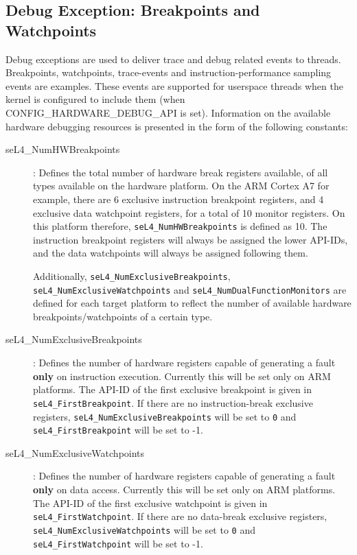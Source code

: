 \subsection{Debug Exception: Breakpoints and Watchpoints}
\label{sec:debug_exceptions}

Debug exceptions are used to deliver trace and debug related events to threads.
Breakpoints, watchpoints, trace-events and instruction-performance sampling
events are examples. These events are supported for userspace threads when the kernel
is configured to include them (when CONFIG\_HARDWARE\_DEBUG\_API is set). Information
on the available hardware debugging resources is presented in the form of the following constants:

\begin{description}
\item[seL4\_NumHWBreakpoints]: Defines the total number of hardware break
registers available, of all types available on the hardware platform. On the ARM
Cortex A7 for example, there are 6 exclusive instruction breakpoint registers,
and 4 exclusive data watchpoint registers, for a total of 10 monitor registers.
On this platform therefore, \texttt{seL4\_NumHWBreakpoints} is defined as 10.
The instruction breakpoint registers will always be assigned the lower API-IDs,
and the data watchpoints will always be assigned following them.

Additionally, \texttt{seL4\_NumExclusiveBreakpoints}, \texttt{seL4\_NumExclusiveWatchpoints}
and \texttt{seL4\_NumDualFunctionMonitors}
are defined for each target platform to reflect the number of available
hardware breakpoints/watchpoints of a certain type.

\item[seL4\_NumExclusiveBreakpoints]: Defines the number of hardware registers
capable of generating a fault \textbf{only} on instruction execution. Currently this will be
set only on ARM platforms. The API-ID of the first exclusive breakpoint is given
in \texttt{seL4\_FirstBreakpoint}. If there are no instruction-break exclusive
registers, \texttt{seL4\_NumExclusiveBreakpoints} will be set to \texttt{0} and
\texttt{seL4\_FirstBreakpoint} will be set to -1.

\item[seL4\_NumExclusiveWatchpoints]: Defines the number of hardware registers
capable of generating a fault \textbf{only} on data access. Currently this will be set only
on ARM platforms. The API-ID of the first exclusive watchpoint is given
in \texttt{seL4\_FirstWatchpoint}. If there are no data-break exclusive
registers, \texttt{seL4\_NumExclusiveWatchpoints} will be set to \texttt{0} and
\texttt{seL4\_FirstWatchpoint} will be set to -1.


\end{description}
